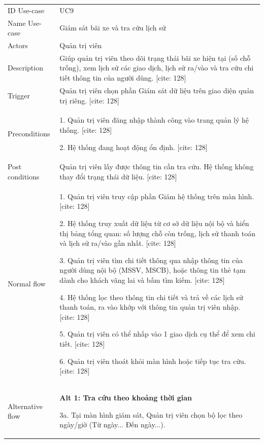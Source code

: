 \begin{center}
    \begin{tabular}{|m{2.5cm}|m{13cm}|}
    \hline
        ID Use-case  & UC9 \\ 
        Name Use-case & Giám sát bãi xe và tra cứu lịch sử \\ 
    \hline
        Actors & Quản trị viên \\
    \hline
        Description & Giúp quản trị viên theo dõi trạng thái bãi xe hiện tại (số chỗ trống), xem lịch sử các giao dịch, lịch sử ra/vào và tra cứu chi tiết thông tin của người dùng. [cite: 128] \\
    \hline
        Trigger & Quản trị viên chọn phần Giám sát dữ liệu trên giao diện quản trị riêng. [cite: 128] \\
    \hline
        Preconditions & 
        1. Quản trị viên đăng nhập thành công vào trang quản lý hệ thống. [cite: 128]
        
        2. Hệ thống đang hoạt động ổn định. [cite: 128] \\
    \hline
        Post conditions & Quản trị viên lấy được thông tin cần tra cứu. Hệ thống không thay đổi trạng thái dữ liệu. [cite: 128] \\
    \hline
        Normal flow & 
        1. Quản trị viên truy cập phần Giám hệ thống trên màn hình. [cite: 128]
        
        2. Hệ thống truy xuất dữ liệu từ cơ sở dữ liệu nội bộ và hiển thị bảng tổng quan: số lượng chỗ còn trống, lịch sử thanh toán và lịch sử ra/vào gần nhất. [cite: 128]
        
        3. Quản trị viên tìm chi tiết thông qua nhập thông tin của người dùng nội bộ (MSSV, MSCB), hoặc thông tin thẻ tạm dành cho khách vãng lai và bấm tìm kiếm. [cite: 128]
        
        4. Hệ thống lọc theo thông tin chi tiết và trả về các lịch sử thanh toán, ra vào khớp với thông tin quản trị viên nhập. [cite: 128]
        
        5. Quản trị viên có thể nhấp vào 1 giao dịch cụ thể để xem chi tiết. [cite: 128]
        
        6. Quản trị viên thoát khỏi màn hình hoặc tiếp tục tra cứu. [cite: 128] \\
    \hline
        Alternative flow & 
        \textbf{Alt 1: Tra cứu theo khoảng thời gian}
        
        3a. Tại màn hình giám sát, Quản trị viên chọn bộ lọc theo ngày/giờ (Từ ngày... Đến ngày...).
        

\end{tabular}
\end{center}
